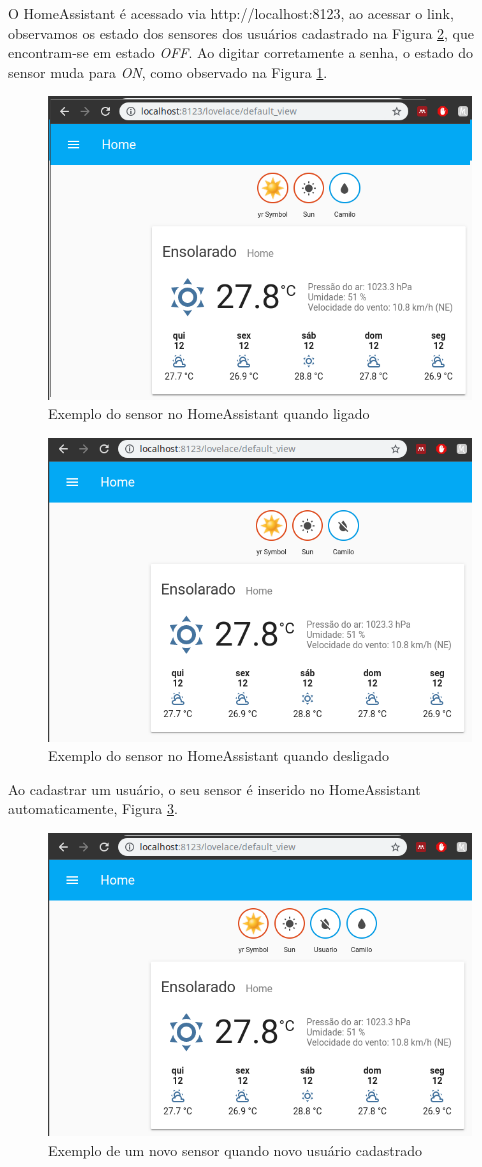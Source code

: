 O HomeAssistant é acessado via http://localhost:8123, ao acessar o link, observamos os estado dos sensores dos usuários cadastrado na Figura \ref{fig:homeassistant-off}, que encontram-se em estado \textit{OFF}. Ao digitar corretamente a senha, o estado do sensor muda para \textit{ON}, como observado na Figura \ref{fig:homeassistant-on}.

\begin{figure}[htbp]
	\centering
	\includegraphics[width=0.6\linewidth]{figuras/homeassistanton.png}
	\caption{Exemplo do sensor no HomeAssistant quando ligado}
	\label{fig:homeassistant-on}
\end{figure}

\begin{figure}[htbp]
	\centering
	\includegraphics[width=0.6\linewidth]{figuras/homeassistantoff.png}
	\caption{Exemplo do sensor no HomeAssistant quando desligado}
	\label{fig:homeassistant-off}
\end{figure}

Ao cadastrar um usuário, o seu sensor é inserido no HomeAssistant automaticamente, Figura \ref{fig:homeassistant-new}.

\begin{figure}[htbp]
	\centering
	\includegraphics[width=1\linewidth]{figuras/homeassistantnewuser.png}
	\caption{Exemplo de um novo sensor quando novo usuário cadastrado}
	\label{fig:homeassistant-new}
\end{figure}



